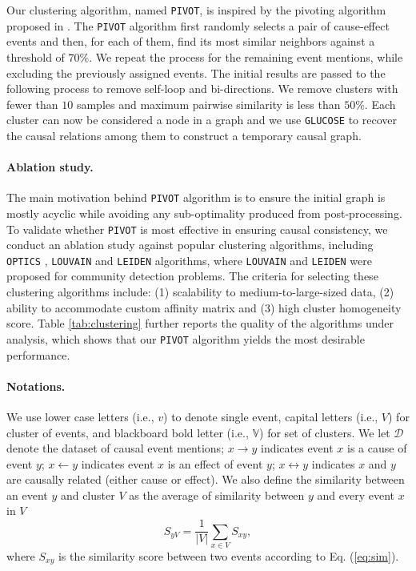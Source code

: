 Our clustering algorithm, named \texttt{PIVOT}, is inspired by the pivoting algorithm proposed in \citet{fukunaga2019lp}. The \texttt{PIVOT} algorithm first randomly selects a pair of cause-effect events and then, for each of them, find its most similar neighbors against a threshold of $70\%$. We repeat the process for the remaining event mentions, while excluding the previously assigned events. The initial results are passed to the following process to remove self-loop and bi-directions. We remove clusters with fewer than $10$ samples and maximum pairwise similarity is less than $50\%$. Each cluster can now be considered a node in a graph and we use \texttt{GLUCOSE} to recover the causal relations among them to construct a temporary causal graph. 

\paragraph{Ablation study.} The main motivation behind \texttt{PIVOT} algorithm is to ensure the initial graph is mostly acyclic while avoiding any sub-optimality produced from post-processing. To validate whether \texttt{PIVOT} is most effective in ensuring causal consistency, we conduct an ablation study against popular clustering algorithms, including \texttt{OPTICS} \cite{ankerst1999optics}, \texttt{LOUVAIN} \cite{blondel2008fast} and \texttt{LEIDEN} \cite{traag2019louvain} algorithms, where \texttt{LOUVAIN} and \texttt{LEIDEN} were proposed for community detection problems. The criteria for selecting these clustering algorithms include: 
(1) scalability to medium-to-large-sized data, (2) ability to accommodate custom affinity matrix and (3) high cluster homogeneity score. Table \ref{tab:clustering} further reports the quality of the algorithms under analysis, which shows that our \texttt{PIVOT} algorithm yields the most desirable performance. 

 
\paragraph{Notations.} We use lower case letters (i.e., $v$) to denote single event, capital letters (i.e., $V$) for cluster of events, and blackboard bold letter (i.e., $\mathbb{V}$) for set of clusters. We let $\mathcal{D}$ denote the dataset of causal event mentions; $x \rightarrow y$ indicates event $x$ is a cause of event $y$; $x \leftarrow y$ indicates event $x$ is an effect of event $y$; $x \leftrightarrow y$ indicates $x$ and $y$ are causally related (either cause or effect). We also define the similarity between an event $y$ and cluster $V$ as the average of similarity between $y$ and every event $x$ in $V$
$$S_{yV} = \frac{1}{|V|} \sum_{x \in V} S_{xy},$$
where $S_{xy}$ is the similarity score between two events according to Eq. (\ref{eq:sim}).


